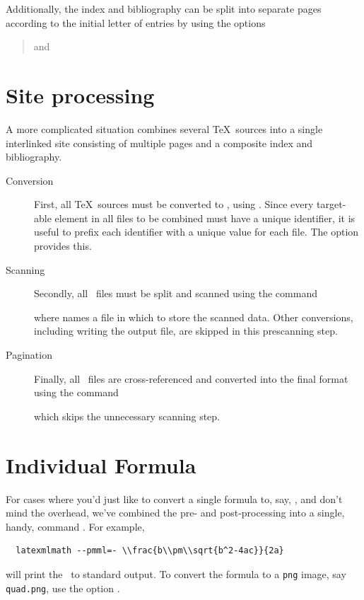 \documentclass{book}
\begin{document}
Additionally, the index and bibliography can be split
into separate pages according to the initial letter of entries by using the options
\begin{quote}
   and 
\end{quote}

\section[Sites]{Site processing}\label{usage.site}
A more complicated situation combines several \TeX\ sources
into a single interlinked site consisting of multiple pages
and a composite index and bibliography.

\begin{description}
\item[Conversion] First, all \TeX\ sources must be converted
   to \XML, using .  Since every target-able element
   in all files to be combined must have a unique identifier, it is useful to
   prefix each identifier with a unique value for each file. 
   The  option  provides this.

 \item[Scanning] Secondly, all \XML\ files must be split and scanned using
  the command
  \begin{quote}
  \end{quote}
  where  names a file in which to store the scanned data.
  Other conversions, including writing the output file, are skipped in this prescanning step.
 
 \item[Pagination] Finally, all \XML\ files are cross-referenced and converted into
   the final format using the command
   \begin{quote}
   \end{quote}
   which skips the unnecessary scanning step.
\end{description}

\section{Individual Formula}\label{usage.latexmlmath}
For cases where you'd just like to convert a single formula to, say, \MathML,
and don't mind the overhead, we've combined the pre- and post-processing into
a single, handy, command .  For example,
\begin{verbatim}
  latexmlmath --pmml=- \\frac{b\\pm\\sqrt{b^2-4ac}}{2a}
\end{verbatim}
will print the \MathML\ to standard output.  
To convert the formula to a \texttt{png} image, say \texttt{quad.png},
use the option .
\end{document}
